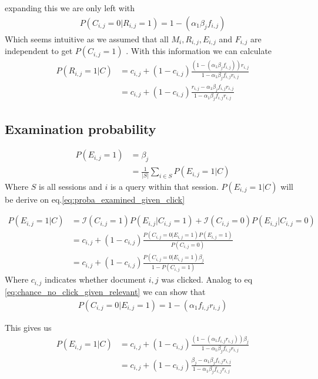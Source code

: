 expanding this we are only left with
\begin{align}
P(C_{i,j}=0|R_{i,j}=1) = 1 - (\alpha_1 \beta_j f_{i,j})
\label{eq:chance_no_click_given_relevant}
\end{align}
Which seems intuitive as we assumed that all $M_i, R_{i,j}, E_{i,j}$ and $F_{i,j}$ are independent to get $P(C_{i,j} = 1)$ . With this information we can calculate 
\begin{align}
P(R_{i,j}=1 | C) &= c_{i,j} + (1-c_{i,j}) \frac { (1 - (\alpha_1 \beta_j f_{i,j}))  r_{i,j}} { 1 - \alpha_1 \beta_j f_{i,j} r_{i,j} } \\
&= c_{i,j} + (1-c_{i,j}) \frac{r_{i,j} - \alpha_1 \beta_j f_{i,j} r_{i,j} }{ 1 - \alpha_1 \beta_j f_{i,j} r_{i,j}}
\end{align}

\subsection{Examination probability}
\begin{align}
P(E_{i,j} = 1) 
&= \beta_j \\
&= \frac{1}{|S|} \sum_{i \in S} P(E_{i,j}=1 | C)
\end{align}
Where $S$ is all sessions and $i$ is a query within that session.
$P(E_{i,j}=1 | C)$ will be derive on eq.\ref{eq:proba_examined_given_click}

\begin{align}
\label{eq:proba_examined_given_click}
P(E_{i,j}=1 | C)
&= \mathcal{I}(C_{i,j} = 1) P(E_{i,j}|C_{i,j}=1) + \mathcal{I}(C_{i,j} = 0) P(E_{i,j}|C_{i,j}=0) \\
&= c_{i,j} + (1-c_{i,j}) \frac {P(C_{i,j}=0|E_{i,j}=1) P(E_{i,j} = 1)} {P(C_{i,j} = 0)} \\
&= c_{i,j} + (1-c_{i,j}) \frac {P(C_{i,j}=0|E_{i,j}=1) \beta_j} { 1 - P(C_{i,j} = 1)}
\end{align}
Where $c_{i,j}$ indicates whether document $i,j$ was clicked.
Analog to eq \ref{eq:chance_no_click_given_relevant} we can show that
\begin{align}
P(C_{i,j}=0|E_{i,j}=1) = 1 - (\alpha_1 f_{i,j} r_{i,j})
\end{align}

This gives us 
\begin{align}
P(E_{i,j}=1 | C) 
&= c_{i,j} + (1-c_{i,j}) \frac {( 1 - (\alpha_1 f_{i,j} r_{i,j}) )\beta_j} { 1 - \alpha_1 \beta_j f_{i,j} r_{i,j}} \\
& = c_{i,j} + (1-c_{i,j}) \frac {\beta_j - \alpha_1 \beta_j f_{i,j} r_{i,j}} { 1 - \alpha_1 \beta_j f_{i,j} r_{i,j}}
\end{align}

